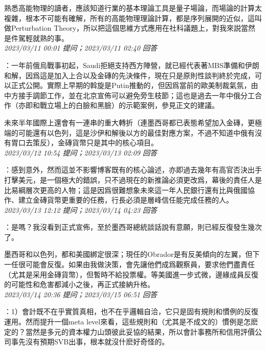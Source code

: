 \documentclass[twocolumn]{ctexart}
\begin{document}
熟悉高能物理的讀者，應該知道行業的基本理論工具是量子場論，而場論的計算太複雜，根本不可能有確解，所有的高能物理理論計算，都是序列展開的近似，這叫做Perturbation Theory，所以把這個思維方式應用在社科議題上，對我來説當然是件駕輕就熟的事。
\\

\textit{\hfill\noindent\small 2023/03/11 00:01 提问；2023/03/11 02:40 回答}

：一年前俄烏戰事初起，Saudi拒絕支持西方陣營，就已經代表著MBS準備和伊朗和解，因爲這是加入上合以及金磚的先決條件，現在只是原則性談判終於完成，可以正式公開。實際上早期的斡旋是Putin推動的，但因爲當前的歐美制裁氣氛，由中方接手調節工作，並在北京宣佈可以避免旁生枝節；這也是過去一年中俄分工合作（亦即和戰立場上的白臉和黑臉）的示範案例，參見正文的建議。

未來半年國際上還會有一連串的重大轉折（連墨西哥都已表態希望加入金磚，更極端的可能還有以色列，這是沙伊和解後以方的最佳對應方案，不過不知道中俄有沒有胃口去策反），金磚貨幣只是其中的核心項目。
\\

\textit{\hfill\noindent\small 2023/03/12 10:54 提问；2023/03/13 02:09 回答}

：感到意外，然而這並不影響博客既有的核心論述，亦即過去幾年有高官否決出手打擊美元，是一個極大的錯誤，只不過現在的新推論必須更改爲，幕後的責任人是比易綱層次更高的人物；這是因爲很難想象未來這一年人民銀行還有比與俄國協作、建立金磚貨幣更重要的任務，行長必須是層峰信任能完成任務的人。
\\

\textit{\hfill\noindent\small 2023/03/13 12:12 提问；2023/03/14 04:23 回答}

：是嗎？我沒看到正式宣佈，至於墨西哥總統談話說有意願，則已經反復發生幾次了。

墨西哥和以色列，都和美國綁定很深；現任的Obrador是有反美傾向的左翼，但下一任很可能會反復。如果由我做決策，會先讓他們成爲觀察員，要求他們盡責任（尤其是采用金磚貨幣），但暫時不給投票權。等美國進一步式微，邊緣成員反復的可能性和危害都減小之後，再正式接納升格。
\\

\textit{\hfill\noindent\small 2023/03/14 20:36 提问；2023/03/15 06:51 回答}

：1）會計既不在乎實質真相，也不在乎邏輯自洽，它只是固有規則和慣例的反復運用。然而提升一個meta level來看，這些規則和（尤其是不成文的）慣例是怎麽定的？當然是多元的資本權力山頭彼此妥協的結果，所以會計事務所和信用評價公司事先沒有預期SVB出事，根本就沒什麽好奇怪的。
\end{document}
